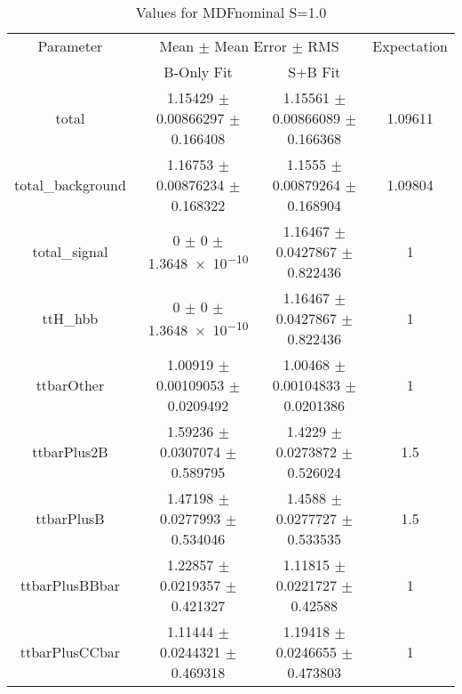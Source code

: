 \begin{table}
\centering
\caption{Values for MDFnominal S=1.0}
\begin{tabular}{cccc}
\toprule
Parameter & \multicolumn{2}{c}{Mean $\pm$ Mean Error $\pm$ RMS} & Expectation\\
 & B-Only Fit & S+B Fit & \\
\midrule
total & \num{1.15429} $\pm$ \num{0.00866297} $\pm$ \num{0.166408} & \num{1.15561} $\pm$ \num{0.00866089} $\pm$ \num{0.166368} & \num{1.09611}\\
total\_background & \num{1.16753} $\pm$ \num{0.00876234} $\pm$ \num{0.168322} & \num{1.1555} $\pm$ \num{0.00879264} $\pm$ \num{0.168904} & \num{1.09804}\\
total\_signal & \num{0} $\pm$ \num{0} $\pm$ \num{1.3648e-10} & \num{1.16467} $\pm$ \num{0.0427867} $\pm$ \num{0.822436} & \num{1}\\
ttH\_hbb & \num{0} $\pm$ \num{0} $\pm$ \num{1.3648e-10} & \num{1.16467} $\pm$ \num{0.0427867} $\pm$ \num{0.822436} & \num{1}\\
ttbarOther & \num{1.00919} $\pm$ \num{0.00109053} $\pm$ \num{0.0209492} & \num{1.00468} $\pm$ \num{0.00104833} $\pm$ \num{0.0201386} & \num{1}\\
ttbarPlus2B & \num{1.59236} $\pm$ \num{0.0307074} $\pm$ \num{0.589795} & \num{1.4229} $\pm$ \num{0.0273872} $\pm$ \num{0.526024} & \num{1.5}\\
ttbarPlusB & \num{1.47198} $\pm$ \num{0.0277993} $\pm$ \num{0.534046} & \num{1.4588} $\pm$ \num{0.0277727} $\pm$ \num{0.533535} & \num{1.5}\\
ttbarPlusBBbar & \num{1.22857} $\pm$ \num{0.0219357} $\pm$ \num{0.421327} & \num{1.11815} $\pm$ \num{0.0221727} $\pm$ \num{0.42588} & \num{1}\\
ttbarPlusCCbar & \num{1.11444} $\pm$ \num{0.0244321} $\pm$ \num{0.469318} & \num{1.19418} $\pm$ \num{0.0246655} $\pm$ \num{0.473803} & \num{1}\\
\bottomrule
\end{tabular}
\end{table}